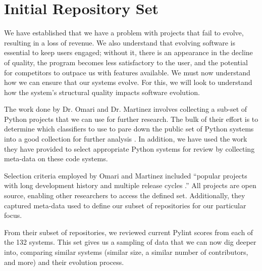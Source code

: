 \section{Initial Repository Set} \label{sectionInitialSet}

We have established that we have a problem with projects that fail to evolve, resulting in a loss of revenue. We also understand that evolving software is essential to keep users engaged; without it, there is an appearance in the decline of quality, the program becomes less satisfactory to the user, and the potential for competitors to outpace us with features available. We must now understand how we can ensure that our systems evolve. For this, we will look to understand how the system's structural quality impacts software evolution.

The work done by Dr. Omari and Dr. Martinez involves collecting a sub-set of Python projects that we can use for further research. The bulk of their effort is to determine which classifiers to use to pare down the public set of Python systems into a good collection for further analysis \cite{omari:2018}. In addition, we have used the work they have provided to select appropriate Python systems for review by collecting meta-data on these code systems.

Selection criteria employed by Omari and Martinez included ``popular projects with long development history and multiple release cycles \cite{omari:2018}.'' All projects are open source, enabling other researchers to access the defined set. Additionally, they captured meta-data used to define our subset of repositories for our particular focus.

From their subset of repositories, we reviewed current Pylint scores from each of the 132 systems. This set gives us a sampling of data that we can now dig deeper into, comparing similar systems (similar size, a similar number of contributors, and more) and their evolution process.
